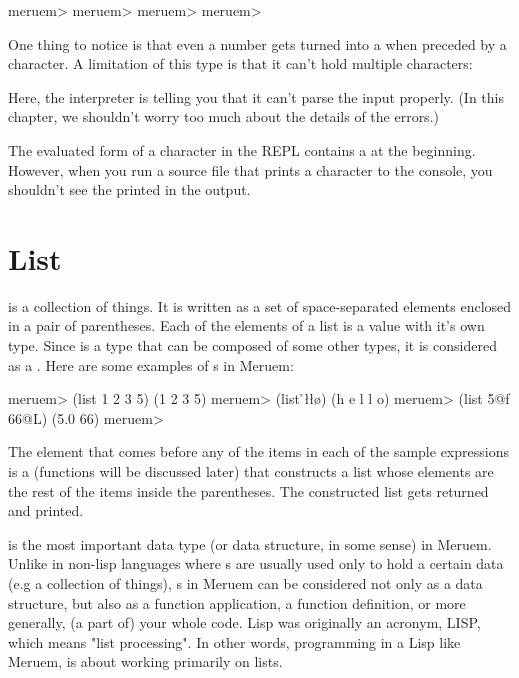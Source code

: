 \begin{REPL}
meruem> \a
\a
meruem> \6 
\6
meruem> \?
\?
meruem> 
\end{REPL}

One thing to notice is that even a number gets turned into a  when preceded by a \code{\textbackslash} character. A limitation of this type is that it can't hold multiple characters:

\begin{REPL}
meruem> \hello
An error has occurred. Parse Failure: string matching regex `\z' expected but `e' found
Source: .home.melvic.meruem.meruem.prelude [11:53}]
(defun truthy? (expr) (and (!= expr false) (!= expr nil)))

\end{REPL}

Here, the interpreter is telling you that it can't parse the input properly. (In this chapter, we shouldn't worry too much about the details of the errors.)

\begin{noteparagraph}
The evaluated form of a character in the REPL contains a \code{\textbackslash} at the beginning. However, when you run a source file that prints a character to the console, you shouldn't see the \code{\textbackslash} printed in the output.
\end{noteparagraph}

\section{List}
 is a collection of things. It is written as a set of space-separated elements enclosed in a pair of parentheses. Each of the elements of a list is a value with it's own type. Since  is a type that can be composed of some other types, it is considered as a . Here are some examples of s in Meruem:

\begin{REPL}
meruem> (list 1 2 3 5)
(1 2 3 5)
meruem> (list \h \e \l \l \o)
(h e l l o)
meruem> (list 5@f 66@L)
(5.0 66)
meruem> 
\end{REPL}


The  element that comes before any of the items in each of the sample expressions is a  (functions will be discussed later) that constructs a list whose elements are the rest of the items inside the parentheses. The constructed list gets returned and printed.

 is the most important data type (or data structure, in some sense) in Meruem. Unlike in non-lisp languages where s are usually used only to hold a certain data (e.g a collection of things), s in Meruem can be considered not only as a data structure, but also as a function application, a function definition, or more generally, (a part of) your whole code. Lisp was originally an acronym, LISP, which means "list processing". In other words, programming in a Lisp like Meruem, is about working primarily on lists. 

